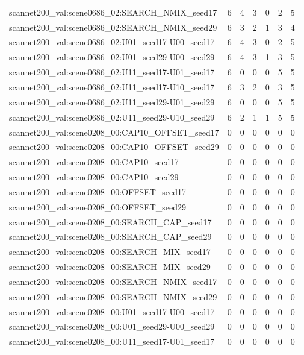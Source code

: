 \begin{table}[t]
\begin{tabular}{lrrrrrr}
scannet200\_val:scene0686\_02:SEARCH\_NMIX\_seed17 & 6 & 4 & 3 & 0 & 2 & 5 \\
scannet200\_val:scene0686\_02:SEARCH\_NMIX\_seed29 & 6 & 3 & 2 & 1 & 3 & 4 \\
scannet200\_val:scene0686\_02:U01\_seed17-U00\_seed17 & 6 & 4 & 3 & 0 & 2 & 5 \\
scannet200\_val:scene0686\_02:U01\_seed29-U00\_seed29 & 6 & 4 & 3 & 1 & 3 & 5 \\
scannet200\_val:scene0686\_02:U11\_seed17-U01\_seed17 & 6 & 0 & 0 & 0 & 5 & 5 \\
scannet200\_val:scene0686\_02:U11\_seed17-U10\_seed17 & 6 & 3 & 2 & 0 & 3 & 5 \\
scannet200\_val:scene0686\_02:U11\_seed29-U01\_seed29 & 6 & 0 & 0 & 0 & 5 & 5 \\
scannet200\_val:scene0686\_02:U11\_seed29-U10\_seed29 & 6 & 2 & 1 & 1 & 5 & 5 \\
scannet200\_val:scene0208\_00:CAP10\_OFFSET\_seed17 & 0 & 0 & 0 & 0 & 0 & 0 \\
scannet200\_val:scene0208\_00:CAP10\_OFFSET\_seed29 & 0 & 0 & 0 & 0 & 0 & 0 \\
scannet200\_val:scene0208\_00:CAP10\_seed17 & 0 & 0 & 0 & 0 & 0 & 0 \\
scannet200\_val:scene0208\_00:CAP10\_seed29 & 0 & 0 & 0 & 0 & 0 & 0 \\
scannet200\_val:scene0208\_00:OFFSET\_seed17 & 0 & 0 & 0 & 0 & 0 & 0 \\
scannet200\_val:scene0208\_00:OFFSET\_seed29 & 0 & 0 & 0 & 0 & 0 & 0 \\
scannet200\_val:scene0208\_00:SEARCH\_CAP\_seed17 & 0 & 0 & 0 & 0 & 0 & 0 \\
scannet200\_val:scene0208\_00:SEARCH\_CAP\_seed29 & 0 & 0 & 0 & 0 & 0 & 0 \\
scannet200\_val:scene0208\_00:SEARCH\_MIX\_seed17 & 0 & 0 & 0 & 0 & 0 & 0 \\
scannet200\_val:scene0208\_00:SEARCH\_MIX\_seed29 & 0 & 0 & 0 & 0 & 0 & 0 \\
scannet200\_val:scene0208\_00:SEARCH\_NMIX\_seed17 & 0 & 0 & 0 & 0 & 0 & 0 \\
scannet200\_val:scene0208\_00:SEARCH\_NMIX\_seed29 & 0 & 0 & 0 & 0 & 0 & 0 \\
scannet200\_val:scene0208\_00:U01\_seed17-U00\_seed17 & 0 & 0 & 0 & 0 & 0 & 0 \\
scannet200\_val:scene0208\_00:U01\_seed29-U00\_seed29 & 0 & 0 & 0 & 0 & 0 & 0 \\
scannet200\_val:scene0208\_00:U11\_seed17-U01\_seed17 & 0 & 0 & 0 & 0 & 0 & 0 \\

\end{tabular}
\end{table}
